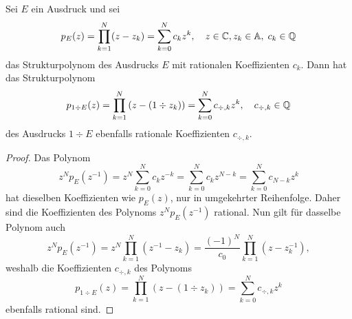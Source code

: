 \begin{theorem}
Sei $E$ ein Ausdruck und sei
\begin{equation*}
  p_E(z) = \prod_{k=1}^N (z-z_k) = \sum_{k=0}^N c_k z^k
  ,\quad
  z\in\mathbb{C},z_k\in\mathbb{A},\;c_k\in\mathbb{Q}
\end{equation*}
das Strukturpolynom des Ausdrucks $E$ mit rationalen Koeffizienten $c_k$.
Dann hat das Strukturpolynom
\begin{equation*}
  p_{1\div E}(z) = \prod_{k=1}^N \left(z-(1\div z_k)\right)
                 = \sum_{k=0}^N c_{\div,k} z^k
  ,\quad
  c_{\div,k}\in\mathbb{Q}
\end{equation*}
des Ausdrucks $1\div E$ ebenfalls rationale Koeffizienten $c_{\div,k}$.
\begin{proof}
Das Polynom
\begin{equation*}
  z^N
  p_E(z^{-1}) = z^N\sum_{k=0}^N c_k z^{-k}
              =    \sum_{k=0}^N c_k z^{N-k}
              =    \sum_{k=0}^N c_{N-k} z^k
\end{equation*}
hat dieselben Koeffizienten wie $p_E(z)$,
nur in umgekehrter Reihenfolge.
Daher sind die Koeffizienten des Polynoms 
$z^N p_E(z^{-1})$ rational.
Nun gilt für dasselbe Polynom auch
\begin{equation*}
  z^N p_E(z^{-1}) 
  = 
  z^N \prod_{k=1}^N (z^{-1}-z_k)
  =
  \frac{(-1)^N}{c_0} \prod_{k=1}^N (z-z_k^{-1}),
\end{equation*}
weshalb die Koeffizienten $c_{\div,k}$ des Polynoms
\begin{equation*}
  p_{1\div E}(z) = \prod_{k=1}^N (z-(1\div z_k))
                 = \sum_{k=0}^N c_{\div,k} z^k
\end{equation*}
ebenfalls rational sind. 
\end{proof}
\end{theorem}


%
%
